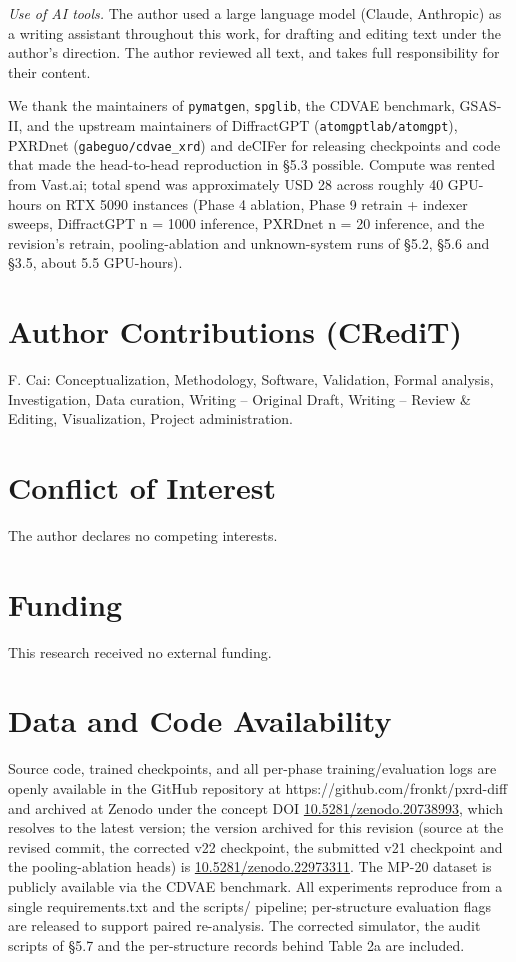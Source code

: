\documentclass[
  11pt,
]{article}
\begin{document}
\emph{Use of AI tools.} The author used a large language model (Claude,
Anthropic) as a writing assistant throughout this work, for drafting and
editing text under the author's direction. The author reviewed all text,
and takes full responsibility for their content.

We thank the maintainers of \texttt{pymatgen}, \texttt{spglib}, the
CDVAE benchmark, GSAS-II, and the upstream maintainers of DiffractGPT
(\texttt{atomgptlab/atomgpt}), PXRDnet (\texttt{gabeguo/cdvae\_xrd}) and
deCIFer for releasing checkpoints and code that made the head-to-head
reproduction in §5.3 possible. Compute was rented from Vast.ai; total
spend was approximately USD 28 across roughly 40 GPU-hours on RTX 5090
instances (Phase 4 ablation, Phase 9 retrain + indexer sweeps,
DiffractGPT n = 1000 inference, PXRDnet n = 20 inference, and the
revision's retrain, pooling-ablation and unknown-system runs of §5.2,
§5.6 and §3.5, about 5.5 GPU-hours).

\section{Author Contributions
(CRediT)}\label{author-contributions-credit}

F. Cai: Conceptualization, Methodology, Software, Validation, Formal
analysis, Investigation, Data curation, Writing -- Original Draft,
Writing -- Review \& Editing, Visualization, Project administration.

\section{Conflict of Interest}\label{conflict-of-interest}

The author declares no competing interests.

\section{Funding}\label{funding}

This research received no external funding.

\section{Data and Code Availability}\label{data-and-code-availability}

Source code, trained checkpoints, and all per-phase training/evaluation
logs are openly available in the GitHub repository at
https://github.com/fronkt/pxrd-diff and archived at Zenodo under the
concept DOI
\href{https://doi.org/10.5281/zenodo.20738993}{10.5281/zenodo.20738993},
which resolves to the latest version; the version archived for this
revision (source at the revised commit, the corrected v22 checkpoint,
the submitted v21 checkpoint and the pooling-ablation heads) is
\href{https://doi.org/10.5281/zenodo.22973311}{10.5281/zenodo.22973311}.
The MP-20 dataset is publicly available via the CDVAE benchmark. All
experiments reproduce from a single requirements.txt and the scripts/
pipeline; per-structure evaluation flags are released to support paired
re-analysis. The corrected simulator, the audit scripts of §5.7 and the
per-structure records behind Table 2a are included.
\end{document}
